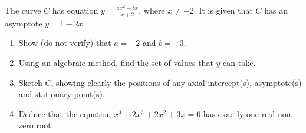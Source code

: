\begin{problem}
    The curve $C$ has equation $y = \frac{ax^2+bx}{x+2}$, where $x \neq -2$. It is given that $C$ has an asymptote $y = 1-2x$.

    \begin{enumerate}
        \item Show (do not verify) that $a = -2$ and $b = -3$.
        \item Using an algebraic method, find the set of values that $y$ can take.
        \item Sketch $C$, showing clearly the positions of any axial intercept(s), asymptote(s) and stationary point(s).
        \item Deduce that the equation $x^4 + 2x^3 + 2x^2 + 3x = 0 $ has exactly one real non-zero root.
    \end{enumerate}
\end{problem}
